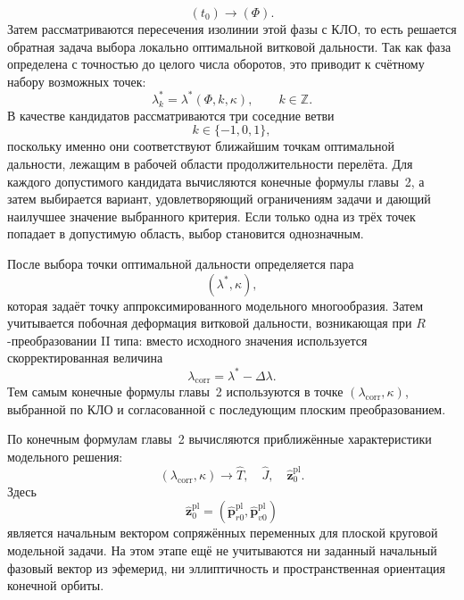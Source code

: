 \begin{equation}
	\left( t_0 \right)\longrightarrow \left( \Phi	\right).
\end{equation}
Затем рассматриваются пересечения изолинии этой фазы с КЛО, то есть решается обратная задача выбора локально оптимальной витковой дальности. Так как фаза определена с точностью до целого числа оборотов, это приводит к счётному набору возможных точек:
\begin{equation}
	\lambda_k^*=\lambda^*(\Phi,k,\kappa),
	\qquad
	k\in\mathbb Z.
\end{equation}
В качестве кандидатов рассматриваются три соседние ветви
\begin{equation}
	k\in\{-1,0,1\},
\end{equation}
поскольку именно они соответствуют ближайшим точкам оптимальной дальности, лежащим в рабочей области продолжительности перелёта. Для каждого допустимого кандидата вычисляются конечные формулы главы~2, а затем выбирается вариант, удовлетворяющий ограничениям задачи и дающий наилучшее значение выбранного критерия. Если только одна из трёх точек попадает в допустимую область, выбор становится однозначным.

После выбора точки оптимальной дальности определяется пара
\begin{equation}
	(\lambda^*,\kappa),
\end{equation}
которая задаёт точку аппроксимированного модельного многообразия. Затем учитывается побочная деформация витковой дальности, возникающая при \(R\)-преобразовании II типа: вместо исходного значения используется скорректированная величина
\begin{equation}
	\lambda_{\mathrm{corr}}=\lambda^*-\Delta\lambda.
\end{equation}
Тем самым конечные формулы главы~2 используются в точке \((\lambda_{\mathrm{corr}},\kappa)\), выбранной по КЛО и согласованной с последующим плоским преобразованием.

По конечным формулам главы~2 вычисляются приближённые характеристики модельного решения:
\begin{equation}
	(\lambda_{\mathrm{corr}},\kappa)
	\longrightarrow
	\widehat T,\quad
	\widehat J,\quad
	\widehat{\mathbf z}^{\mathrm{pl}}_0 .
\end{equation}
Здесь
\begin{equation}
	\widehat{\mathbf z}^{\mathrm{pl}}_0=
	\left(
	\widehat{\mathbf p}_{r0}^{\mathrm{pl}},
	\widehat{\mathbf p}_{v0}^{\mathrm{pl}}
	\right)
\end{equation}
является начальным вектором сопряжённых переменных для плоской круговой модельной задачи. На этом этапе ещё не учитываются ни заданный начальный фазовый вектор из эфемерид, ни эллиптичность и пространственная ориентация конечной орбиты.

